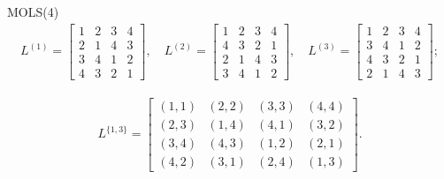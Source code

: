 \documentclass{beamer}
\begin{document}
\begin{frame}{MOLS(4)}
\[
\begin{aligned}
    L^{(1)} = \begin{bmatrix}
        1 & 2 & 3 & 4\\
        2 & 1 & 4 & 3\\
        3 & 4 & 1 & 2\\
        4 & 3 & 2 & 1
    \end{bmatrix},\quad 
    L^{(2)} = \begin{bmatrix}
        1 & 2 & 3 & 4\\
        4 & 3 & 2 & 1\\
        2 & 1 & 4 & 3\\
        3 & 4 & 1 & 2
    \end{bmatrix},\quad
    L^{(3)} = \begin{bmatrix}
        1&2&3&4\\
        3&4&1&2\\
        4&3&2&1\\
        2&1&4&3
    \end{bmatrix};
\end{aligned}
\]

\[
\begin{aligned}
    L^{\{1,3\}} =
    \begin{bmatrix}
        (1,1) & (2,2) & (3,3) & (4,4)\\
        (2,3) & (1,4) & (4,1) & (3,2)\\
        (3,4) & (4,3) & (1,2) & (2,1)\\
        (4,2) & (3,1) & (2,4) & (1,3)
    \end{bmatrix}.
\end{aligned}
\]
\end{frame}
\end{document}
